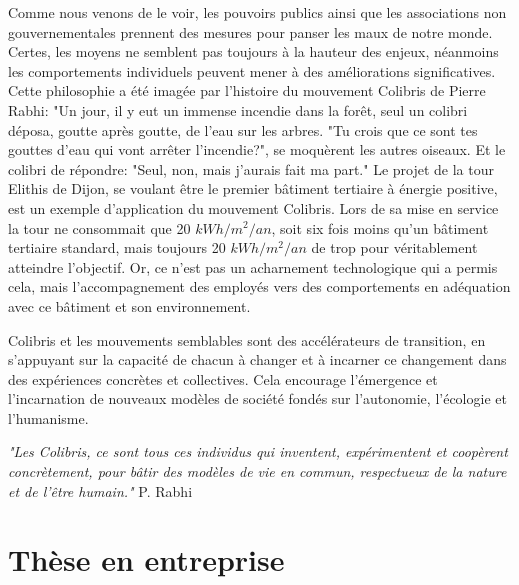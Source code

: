Comme nous venons de le voir, les pouvoirs publics ainsi que les associations non gouvernementales prennent des mesures pour panser les maux de notre monde. Certes, les moyens ne semblent pas toujours à la hauteur des enjeux, néanmoins les comportements individuels peuvent mener à des améliorations significatives. Cette philosophie a été imagée par l'histoire du mouvement Colibris de Pierre Rabhi: "Un jour, il y eut un immense incendie dans la forêt, seul un colibri déposa, goutte après goutte, de l'eau sur les arbres. "Tu crois que ce sont tes gouttes d'eau qui vont arrêter l'incendie?", se moquèrent les autres oiseaux. Et le colibri de répondre: "Seul, non, mais j'aurais fait ma part." Le projet de la tour Elithis de Dijon, se voulant être le premier bâtiment tertiaire à énergie positive, est un exemple d'application du mouvement Colibris. Lors de sa mise en service la tour ne consommait que 20 $kWh/m^2/an$, soit six fois moins qu'un bâtiment tertiaire standard, mais toujours 20 $kWh/m^2/an$ de trop pour véritablement atteindre l'objectif. Or, ce n'est pas un acharnement technologique qui a permis cela, mais l'accompagnement des employés vers des comportements en adéquation avec ce bâtiment et son environnement. %

Colibris et les mouvements semblables sont des accélérateurs de transition, en s'appuyant sur la capacité de chacun à changer et à incarner ce changement dans des expériences concrètes et collectives. Cela encourage l'émergence et l'incarnation de nouveaux modèles de société fondés sur l'autonomie, l'écologie et l'humanisme.

\textit{"Les Colibris, ce sont tous ces individus qui inventent, expérimentent et coopèrent concrètement, pour bâtir des modèles de vie en commun, respectueux de la nature et de l'être humain."} P. Rabhi

\section*{Thèse en entreprise}

